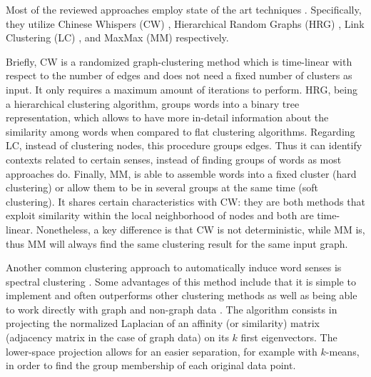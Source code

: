 Most of the reviewed approaches employ state of the art techniques \cite{2008.Klapaftis.WSIUsingCollocations,2010.Klapaftis.WSD.WSD.HierarchicalGraphs,2011.Jurgens.WSICommunityDetection,2013.Hope.GradedWSI}. Specifically, they utilize Chinese Whispers (CW) \cite{biemann2006chinese}, Hierarchical Random Graphs (HRG) \cite{clauset2008hierarchical}, Link Clustering (LC) \cite{ahn2010link}, and MaxMax (MM) \cite{hope2013maxmax} respectively. 

Briefly, CW is a randomized graph-clustering method  which is time-linear with respect to the number of edges and does not need a fixed number of clusters as input. It only requires a maximum amount of iterations to perform. HRG, being a hierarchical clustering algorithm, groups words into a binary tree representation, which allows to have more in-detail information about the similarity among words when compared to flat clustering algorithms. Regarding LC, instead of clustering nodes, this procedure groups edges. Thus it can identify contexts related to certain senses, instead of finding groups of words as most approaches do. Finally, MM, is able to assemble words into a fixed cluster (hard clustering) or allow them to be in several groups at the same time (soft clustering). It shares certain characteristics with CW:  they are both methods that exploit similarity within the local neighborhood of nodes and both are time-linear. Nonetheless, a key difference is that CW is not deterministic, while MM is, thus MM will always find the same clustering result for the same input graph.

Another common clustering approach to automatically induce word senses \cite{GoyalH14,Song16} is spectral clustering \cite{Shi2000}. Some advantages of this method include that it is simple to implement and often outperforms other clustering methods as well as being able to work directly with graph and non-graph data \cite{Luxburg2007}.
%
The algorithm consists in projecting the normalized Laplacian of an affinity (or similarity) matrix (adjacency matrix in the case of graph data) on its $k$ first eigenvectors. The lower-space projection allows for an easier separation, for example with $k$-means, in order to find the  group membership of each original data point. 

%

